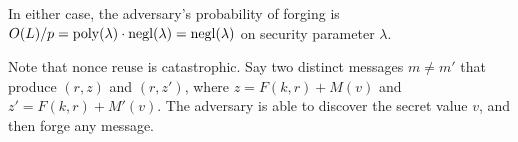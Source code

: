 \begin{itemize}
     In either case, the adversary's probability of forging is
     $O(L)/p = \operatorname{poly}(\lambda) \cdot \operatorname{negl}(\lambda) = \operatorname{negl}(\lambda)$
     on security parameter $\lambda$.
\end{itemize}

Note that nonce reuse is catastrophic. Say two distinct messages $m \neq m'$
that produce $(r, z)$ and $(r, z')$, where $z = F(k,r) + M(v)$ and
$z' = F(k,r) + M'(v)$. The adversary is able to discover the secret value $v$, and then forge any message.


% 
% 
% 

